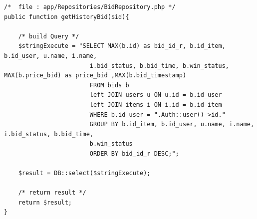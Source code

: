 \begin{lstlisting}[label=cdrep.02-04,style=php,caption=Implementasi \textit{Repository}: Melihat Riwayat Penawaran]
/*  file : app/Repositories/BidRepository.php */
public function getHistoryBid($id){

    /* build Query */
    $stringExecute = "SELECT MAX(b.id) as bid_id_r, b.id_item, b.id_user, u.name, i.name,
                        i.bid_status, b.bid_time, b.win_status, MAX(b.price_bid) as price_bid ,MAX(b.bid_timestamp)
                        FROM bids b
                        left JOIN users u ON u.id = b.id_user
                        left JOIN items i ON i.id = b.id_item
                        WHERE b.id_user = ".Auth::user()->id."
                        GROUP BY b.id_item, b.id_user, u.name, i.name, i.bid_status, b.bid_time,
                        b.win_status
                        ORDER BY bid_id_r DESC;";
    
    $result = DB::select($stringExecute);

    /* return result */
    return $result;
}
\end{lstlisting}


